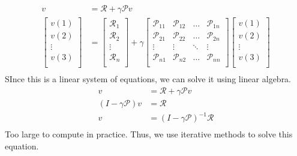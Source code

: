 \[
    \begin{aligned}
        v &= \mathcal{R} + \gamma \mathcal{P} v  \\
        \begin{bmatrix}
             v(1) \\
             v(2) \\
             \vdots \\
             v(3) \\
        \end{bmatrix} & = 
        \begin{bmatrix}
            \mathcal{R} _{1} \\
            \mathcal{R} _{2} \\
            \vdots \\
            \mathcal{R} _{n} \\
        \end{bmatrix} + \gamma
        \begin{bmatrix}
            \mathcal{P} _{11} & \mathcal{P} _{12} & \dots & \mathcal{P} _{1n} \\
            \mathcal{P} _{21} & \mathcal{P} _{22} & \dots & \mathcal{P} _{2n} \\
            \vdots & \vdots & \ddots & \vdots \\
            \mathcal{P} _{n1} & \mathcal{P} _{n2} & \dots & \mathcal{P} _{nn} \\
        \end{bmatrix}
        \begin{bmatrix}
            v(1) \\
            v(2) \\
            \vdots \\
            v(3) \\
        \end{bmatrix} \\
        \end{aligned}
\]
SInce this is a linear system of equations, we can solve it using linear algebra.
\[
    \begin{aligned}
        v &= \mathcal{R} + \gamma \mathcal{P} v  \\
        (I - \gamma \mathcal{P} ) v &= \mathcal{R}  \\
        v &= (I - \gamma \mathcal{P} )^{-1} \mathcal{R}  \\      
    \end{aligned}
\]
Too large to compute in practice. Thus, we use iterative methods to solve
this equation.

